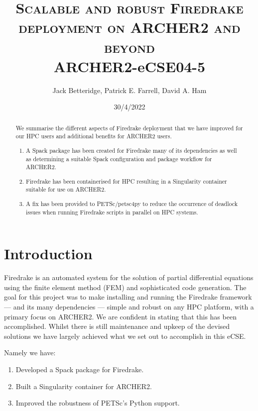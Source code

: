 \documentclass[a4paper,11pt]{article}
\title{\textsc{Scalable and robust Firedrake deployment on ARCHER2 and beyond}\\
\Large ARCHER2-eCSE04-5}
\author{Jack Betteridge, Patrick E. Farrell, David A. Ham}
\date{30/4/2022}
\begin{document}
\maketitle

\begin{abstract}
	We summarise the different aspects of Firedrake deployment that we have improved for our HPC users and additional benefits for ARCHER2 users.
	\begin{enumerate}
	\item A Spack package has been created for Firedrake many of its dependencies as well as determining a suitable Spack configuration and package workflow for ARCHER2.
	\item Firedrake has been containerised for HPC resulting in a Singularity container suitable for use on ARCHER2.
	\item A fix has been provided to PETSc/petsc4py to reduce the occurrence of deadlock issues when running Firedrake scripts in parallel on HPC systems.
\end{enumerate}
\end{abstract}

\section{Introduction}
\label{sec:intro}
Firedrake is an automated system for the solution of partial differential equations using the finite element method (FEM) and sophisticated code generation.
The goal for this project was to make installing and running the Firedrake framework\cite{firedrakeweb,firedrakepaper} --- and its many dependencies --- simple and robust on any HPC platform, with a primary focus on ARCHER2.
We are confident in stating that this has been accomplished.
Whilst there is still maintenance and upkeep of the devised solutions we have largely achieved what we set out to accomplish in this eCSE.

\noindent Namely we have:
\begin{enumerate}[topsep=2pt, partopsep=0pt, itemsep=1pt, parsep=1pt]
    \item Developed a Spack package for Firedrake.
	\item Built a Singularity container for ARCHER2.
	\item Improved the robustness of PETSc's Python support.
\end{enumerate} 
\end{document}
